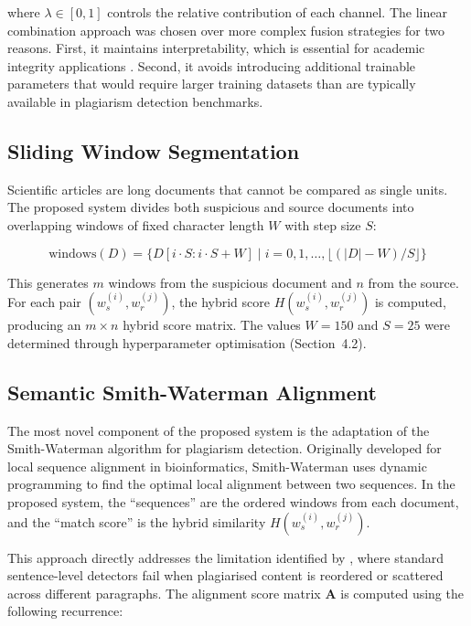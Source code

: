 \documentclass[12pt, a4paper]{article}
\begin{document}
\noindent where $\lambda \in [0, 1]$ controls the relative contribution of each channel. The linear combination approach was chosen over more complex fusion strategies for two reasons. First, it maintains interpretability, which is essential for academic integrity applications \citep{Sajid2025}. Second, it avoids introducing additional trainable parameters that would require larger training datasets than are typically available in plagiarism detection benchmarks.

\subsection{Sliding Window Segmentation}

Scientific articles are long documents that cannot be compared as single units. The proposed system divides both suspicious and source documents into overlapping windows of fixed character length $W$ with step size $S$:

\begin{equation}
	\text{windows}(D) = \{D[i \cdot S : i \cdot S + W] \mid i = 0, 1, \ldots, \lfloor(|D| - W) / S\rfloor\}
	\label{eq:windowing}
\end{equation}

This generates $m$ windows from the suspicious document and $n$ from the source. For each pair $(w_s^{(i)}, w_r^{(j)})$, the hybrid score $H(w_s^{(i)}, w_r^{(j)})$ is computed, producing an $m \times n$ hybrid score matrix. The values $W = 150$ and $S = 25$ were determined through hyperparameter optimisation (Section~4.2).

\subsection{Semantic Smith-Waterman Alignment}

The most novel component of the proposed system is the adaptation of the Smith-Waterman algorithm \citep{SmithWaterman1981} for plagiarism detection. Originally developed for local sequence alignment in bioinformatics, Smith-Waterman uses dynamic programming to find the optimal local alignment between two sequences. In the proposed system, the ``sequences'' are the ordered windows from each document, and the ``match score'' is the hybrid similarity $H(w_s^{(i)}, w_r^{(j)})$.

This approach directly addresses the limitation identified by \citet{Saqaabi2025}, where standard sentence-level detectors fail when plagiarised content is reordered or scattered across different paragraphs. The alignment score matrix $\mathbf{A}$ is computed using the following recurrence:
\end{document}
